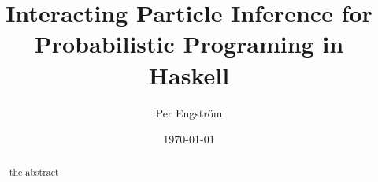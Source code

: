 \documentclass[a4paper, twoside, twocolumn, html, DIV=12]{scrartcl}
\title{Interacting Particle Inference for Probabilistic Programing in Haskell}
\author{Per Engström}
\date{\today}
\begin{document}
\maketitle
\begin{abstract}
  the abstract
\end{abstract}








\end{document}
